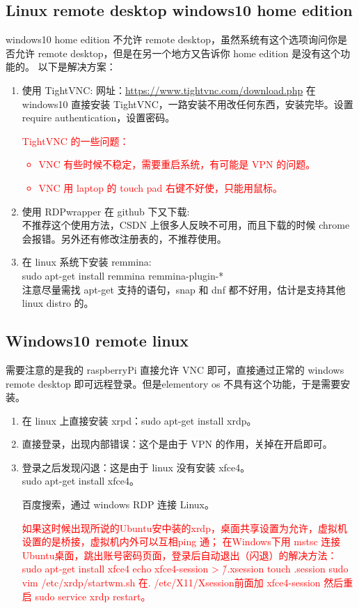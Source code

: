 \documentclass[UTF8,fancyhdr,a4paper]{ctexart}
\newcommand{\pflred}[1]{\textcolor{red}{#1}}
\begin{document}
\subsection{Linux remote desktop windows10 home edition}
windows10 home edition 不允许 remote desktop，虽然系统有这个选项询问你是否允许 remote desktop，但是在另一个地方又告诉你 home edition 是没有这个功能的。
以下是解决方案：
\begin{enumerate}
\item 使用 TightVNC:
网址：\url{https://www.tightvnc.com/download.php}
在 windows10 直接安装 TightVNC，一路安装不用改任何东西，安装完毕。设置require authentication，设置密码。\\
\pflred
{TightVNC 的一些问题：
\begin{itemize}
\item VNC 有些时候不稳定，需要重启系统，有可能是 VPN 的问题。
\item VNC 用 laptop 的 touch pad 右键不好使，只能用鼠标。
\end{itemize}
}



\item 使用 RDPwrapper 在 github 下又下载:\\
不推荐这个使用方法，CSDN 上很多人反映不可用，而且下载的时候 chrome 会报错。另外还有修改注册表的，不推荐使用。
\item 在 linux 系统下安装 remmina:\\
sudo apt-get install remmina remmina-plugin-*\\
注意尽量需找 apt-get 支持的语句，snap 和 dnf 都不好用，估计是支持其他 linux distro 的。




\end{enumerate}

\subsection{Windows10 remote linux}
需要注意的是我的 raspberryPi 直接允许 VNC 即可，直接通过正常的 windows remote desktop 即可远程登录。但是elementory os 不具有这个功能，于是需要安装。
\begin{enumerate}
\item 在 linux 上直接安装 xrpd：sudo apt-get install xrdp。
\item 直接登录，出现内部错误：这个是由于 VPN 的作用，关掉在开启即可。
\item 登录之后发现闪退：这是由于 linux 没有安装 xfce4。\\ sudo apt-get install xfce4。\par
百度搜索，通过 windows RDP 连接 Linux。

\pflred{如果这时候出现所说的Ubuntu安中装的xrdp，桌面共享设置为允许，虚拟机设置的是桥接，虚拟机内外可以互相ping 通；
在Windows下用 mstsc 连接Ubuntu桌面，跳出账号密码页面，登录后自动退出（闪退）的解决方法：sudo apt-get install xfce4
echo xfce4-session > \~/.xsession
touch .session
sudo vim /etc/xrdp/startwm.sh
在. /etc/X11/Xsession前面加
xfce4-session
然后重启 sudo service xrdp restart。}


\end{enumerate}
\end{document}

